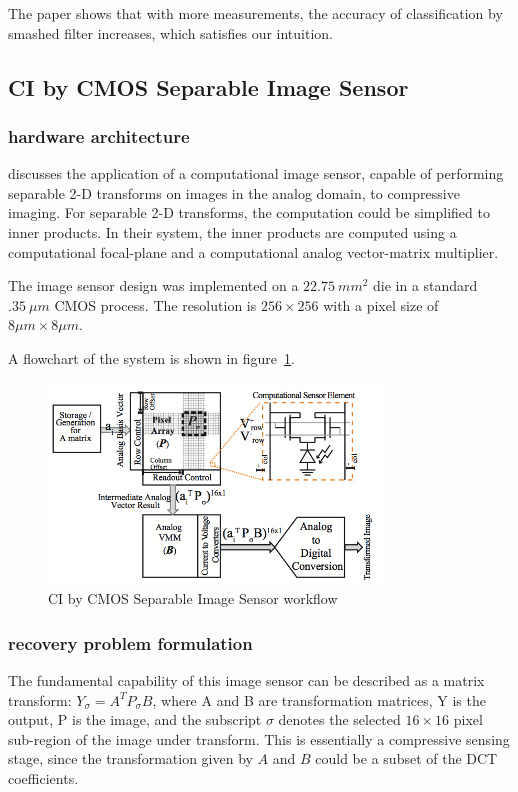 \documentclass{article} %
\begin{document}
The paper shows that with more measurements, the accuracy of classification by smashed filter increases, which satisfies our intuition.

\subsection{CI by CMOS Separable Image Sensor}
\subsubsection{hardware architecture}
\cite{robucci2010compressive} discusses the application of a computational image sensor, capable of performing separable 2-D transforms on images in the analog domain, to compressive imaging. For separable 2-D transforms, the computation could be simplified to inner products. In their system, the inner products are computed using a computational focal-plane and a computational analog vector-matrix multiplier.
 
The image sensor design was implemented on a $22.75~mm^2$ die in a standard $.35~\mu m$ CMOS process. The resolution is $256 \times 256$ with a pixel size of $8 \mu m \times 8 \mu m$.

A flowchart of the system is shown in figure~\ref{fig:sepFlow}.
\begin{figure}[!h]
\centering
\includegraphics[width=3.5in]{sepFlow.png}
\caption{CI by CMOS Separable Image Sensor workflow }
\label{fig:sepFlow}
\end{figure}

\subsubsection{recovery problem formulation}
The fundamental capability of this image sensor can be described as a matrix transform: $Y_\sigma = A^TP_\sigma B$, where A and B are transformation matrices, Y is the output, P is the image, and the subscript $\sigma$ denotes the selected $16\times16$ pixel sub-region of the image under transform. This is essentially a compressive sensing stage, since the transformation given by $A$ and $B$ could be a subset of the DCT coefficients. 
\end{document}
